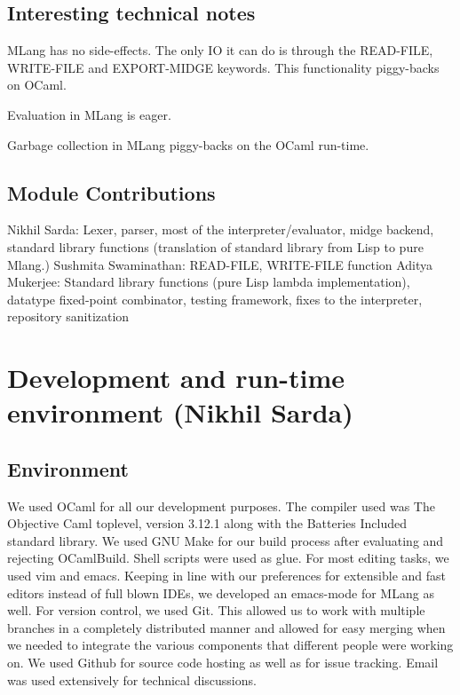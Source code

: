 \documentclass[letterpaper,11pt]{article}
\begin{document}
{\subsection{Interesting technical notes}

MLang has no side-effects. The only IO it can do is through the READ-FILE, WRITE-FILE and EXPORT-MIDGE keywords. This functionality piggy-backs on
OCaml.

Evaluation in MLang is eager.

Garbage collection in MLang piggy-backs on the OCaml run-time.

\subsection{Module Contributions}
Nikhil Sarda: Lexer, parser, most of the interpreter/evaluator, midge backend, standard library functions (translation of standard library from Lisp to pure Mlang.)
Sushmita Swaminathan: READ-FILE, WRITE-FILE function
Aditya Mukerjee: Standard library functions (pure Lisp lambda implementation), datatype fixed-point combinator, testing framework, fixes to the interpreter, repository sanitization


\section{Development and run-time environment (Nikhil Sarda)}

\subsection{Environment}


We used OCaml for all our development purposes. The compiler used was The Objective Caml toplevel, version 3.12.1 along with the Batteries Included
standard library. We used GNU Make for our build process after evaluating and rejecting OCamlBuild. Shell scripts were used as glue.
For most editing tasks, we used vim and emacs. Keeping in line with our preferences for extensible and fast editors instead of full
blown IDEs, we developed an emacs-mode for MLang as well. For version control, we used Git. This allowed us to work with multiple branches in a
completely distributed manner and allowed for easy merging when we needed to integrate the various components that different people were working on.
We used Github for source code hosting as well as for issue tracking. Email was used extensively for technical discussions.

}
\end{document}
